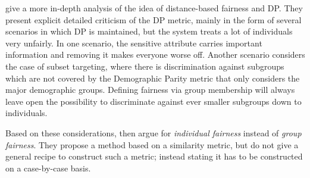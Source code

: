 \citet{dwork2012fairness} give a more in-depth analysis
of the idea of distance-based fairness and \ac{DP}.
They present explicit detailed criticism of the \ac{DP} metric,
mainly in the form of several scenarios in which \ac{DP} is maintained,
but the system treats a lot of individuals very unfairly.
In one scenario, the sensitive attribute carries important information
and removing it makes everyone worse off.
Another scenario considers the case of subset targeting,
where there is discrimination against subgroups
which are not covered by the Demographic Parity metric
that only considers the major demographic groups.
Defining fairness via group membership will always leave open the possibility
to discriminate against ever smaller subgroups down to individuals.

Based on these considerations, \citet{dwork2012fairness} then argue for
\emph{individual fairness} instead of \emph{group fairness}.
They propose a method based on a similarity metric,
but do not give a general recipe to construct such a metric;
instead stating it has to be constructed on a case-by-case basis.


